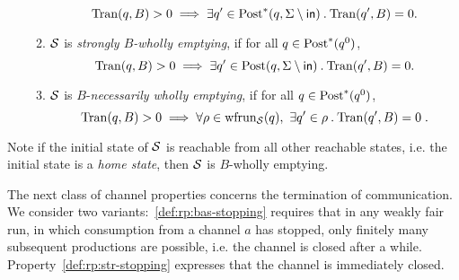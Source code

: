 \begin{definition}
\begin{enumerate}[label=P\arabic*:, ref=(P\arabic*), leftmargin=*]
\begin{enumerate}[label=\alph*), ref=(P\arabic{enumi}.\alph*), leftmargin=*, itemsep=2pt]
                \[
                    \val(q,B)>0 \implies \exists q' \in \post^*(q,\Sigma\setminus \inset)\: .\:\val(q',B)=0.
                \]
                \item\label{def:cp:str-wholly-emptying} $\S$ is \emph{strongly $B$-wholly emptying}, if for all $q \in \post^*(q^0)$,
                \[
                    \val(q,B)>0 \implies \exists q' \in \post(q,\Sigma\setminus \inset)\: .\:\val(q',B)=0.
                \] 
                \item\label{def:cp:nec-wholly-emptying} $\S$ is $B$-\emph{necessarily wholly emptying}, if for all $q \in \post^*(q^0)$,
                \[
                    \val(q,B)>0 \implies \forall \rho \in \frun{\S}(q),\ \exists q' \in \rho\: .\:\val(q',B)=0 \;.
                \] 
            \end{enumerate}
        \end{enumerate}
\end{definition}
Note if the initial state of $\S$ is reachable from all other reachable states, i.e. the initial state is a \emph{home state}, then $\S$ is $B$-wholly emptying.

The next class of channel properties concerns the termination of communication. We consider two variants:~\ref{def:rp:bas-stopping} requires that in any weakly fair run, in which consumption from a channel $a$ has stopped, only finitely many subsequent productions are possible, i.e. the channel  is closed after a while.
Property~\ref{def:rp:str-stopping} expresses that the channel is immediately closed.


